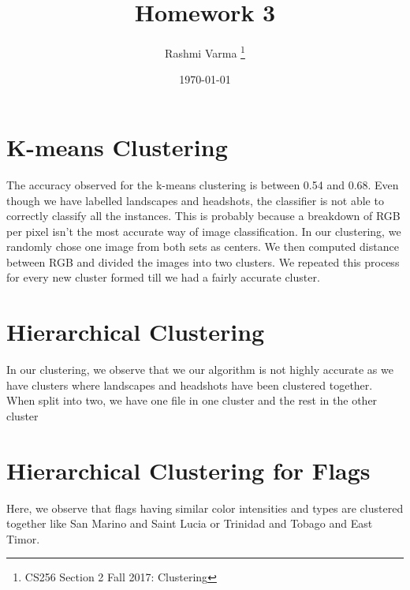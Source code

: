\documentclass{article}
\title{Homework 3}
\author{Rashmi Varma
\thanks{CS256 Section 2 Fall 2017: Clustering}}
\date{\today}
\begin{document}
\maketitle
 

\section{K-means Clustering}
The accuracy observed for the k-means clustering is between 0.54 and 0.68. Even though we have labelled landscapes and headshots, the classifier is not able to correctly classify all the instances. This is probably because a breakdown of RGB per pixel isn't the most accurate way of image classification. In our clustering, we randomly chose one image from both sets as centers. We then computed distance between RGB and divided the images into two clusters. We repeated this process for every new cluster formed till we had a fairly accurate cluster. 


\section{Hierarchical Clustering}
In our clustering, we observe that we our algorithm is not highly accurate as we have clusters where landscapes and headshots have been clustered together. When split into two, we have one file in one cluster and the rest in the other cluster

\section{Hierarchical Clustering for Flags}
Here, we observe that flags having similar color intensities and types are clustered together like San Marino and Saint Lucia or Trinidad and Tobago and East Timor.
\end{document}
